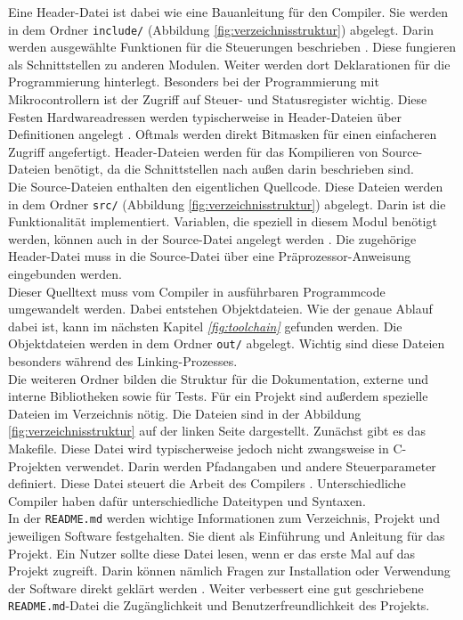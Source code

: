 Eine Header-Datei ist dabei wie eine Bauanleitung für den Compiler.
Sie werden in dem Ordner \verb*|include/| (Abbildung \ref{fig:verzeichnisstruktur}) abgelegt.
Darin werden ausgewählte Funktionen für die Steuerungen beschrieben \cite{Klima2010-br}.
Diese fungieren als Schnittstellen zu anderen Modulen.
Weiter werden dort Deklarationen für die Programmierung hinterlegt.
Besonders bei der Programmierung mit Mikrocontrollern ist der Zugriff auf Steuer- und Statusregister wichtig.
Diese Festen Hardwareadressen werden typischerweise in Header-Dateien über Definitionen angelegt \cite{Wust2010-jg}.
Oftmals werden direkt Bitmasken für einen einfacheren Zugriff angefertigt.
Header-Dateien werden für das Kompilieren von Source-Dateien benötigt, da die Schnittstellen nach außen darin beschrieben sind.\\

Die Source-Dateien enthalten den eigentlichen Quellcode.
Diese Dateien werden in dem Ordner \verb*|src/| (Abbildung \ref{fig:verzeichnisstruktur}) abgelegt.
Darin ist die Funktionalität implementiert.
Variablen, die speziell in diesem Modul benötigt werden, können auch in der Source-Datei angelegt werden \cite{Garcia2017-op}.
Die zugehörige Header-Datei muss in die Source-Datei über eine Präprozessor-Anweisung eingebunden werden. \\

Dieser Quelltext muss vom Compiler in ausführbaren Programmcode umgewandelt werden.
Dabei entstehen Objektdateien.
Wie der genaue Ablauf dabei ist, kann im nächsten Kapitel \textit{\ref{fig:toolchain} } gefunden werden.
Die Objektdateien werden in dem Ordner \verb*|out/| abgelegt.
Wichtig sind diese Dateien besonders während des Linking-Prozesses. \\

Die weiteren Ordner bilden die Struktur für die Dokumentation, externe und interne Bibliotheken sowie für Tests.
Für ein Projekt sind außerdem spezielle Dateien im Verzeichnis nötig.
Die Dateien sind in der Abbildung \ref{fig:verzeichnisstruktur} auf der linken Seite dargestellt.
Zunächst gibt es das Makefile.
Diese Datei wird typischerweise jedoch nicht zwangsweise in C-Projekten verwendet.
Darin werden Pfadangaben und andere Steuerparameter definiert.
Diese Datei steuert die Arbeit des Compilers \cite{Schmitt2019-nd}.
Unterschiedliche Compiler haben dafür unterschiedliche Dateitypen und Syntaxen.\\

In der \verb*|README.md| werden wichtige Informationen zum Verzeichnis, Projekt und jeweiligen Software festgehalten.
Sie dient als Einführung und Anleitung für das Projekt.
Ein Nutzer sollte diese Datei lesen, wenn er das erste Mal auf das Projekt zugreift.
Darin können nämlich Fragen zur Installation oder Verwendung der Software direkt geklärt werden \cite{inet:ionos}.
Weiter verbessert eine gut geschriebene \verb*|README.md|-Datei die Zugänglichkeit und Benutzerfreundlichkeit des Projekts. \\


